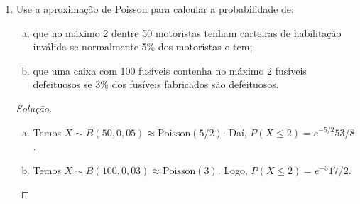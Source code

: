 \documentclass[../Notas.tex]{subfiles}
\begin{document}
\begin{enumerate}
\begin{proof}
\begin{enumerate}[a)]
\begin{align*}
                                 \sum_{x_1=0}^z\binom{z}{x_1}p_1^{x_1}p_2^{z-x_1} \\
                                 &= \binom{n}{z}[1 - (p_1+p_2)]^{n-z}(p-1+p_2)^z.
            \end{align*}
            Logo, $X_1+X_2\sim B(n, p_1+p_2)$.
            \item Dado $z\in\{0, 1, \dots, n\}$, temos
            \begin{align*}
                P(X_2 = y|X_1+X_2 = z) &= \frac{P(X_2 = y, X_1 = z-y)}{P(X_1+X_2 = z)} \\
                                       &= \frac{P(X_2 = y, X_1 = z-y, X_3 = n-z)}{P(X_1+X_2 = z)} \\
                                       &= \frac{n!}{(z-y)!y!(n-z)!}\cdot
                                       \frac{p_1^{z-y}p_2^{y}p_3^{n-z}}{(p_1+p_2)^zp_3^{n-z}}\cdot
                                       \frac{z!(n-z)!}{n!} \\
                                       &= \binom{z}{y}\left(\frac{p_1}{p_1+p_2}\right)^{z-y}
                                       \left(\frac{p_2}{p_1+p_2}\right)^y
            \end{align*}
            para $y = 0, 1, \dots, z$ e $0$ caso contrário.
        \end{enumerate}
    \end{proof}
    \item Use a aproximação de Poisson para calcular a probabilidade de:
    \begin{enumerate}[a)]
    \item que no máximo 2 dentre 50 motoristas tenham carteiras de habilitação inválida se normalmente 5\% dos motoristas o tem;
    \item que uma caixa com 100 fusíveis contenha no máximo 2 fusíveis defeituosos se 3\% dos fusíveis fabricados são defeituosos.
    \end{enumerate}
    \begin{proof}[Solução]
        \begin{enumerate}[a)]
            \item Temos $X\sim B(50, 0,05) \approx \text{Poisson}(5/2)$. Daí, 
            $P(X\leq 2) = e^{-5/2}53/8$.
            \item Temos $X\sim B(100, 0,03) \approx \text{Poisson}(3)$. Logo,
            $P(X\leq 2) = e^{-3}17/2$.
        \end{enumerate}
    \end{proof}

\end{enumerate}
\end{document}
